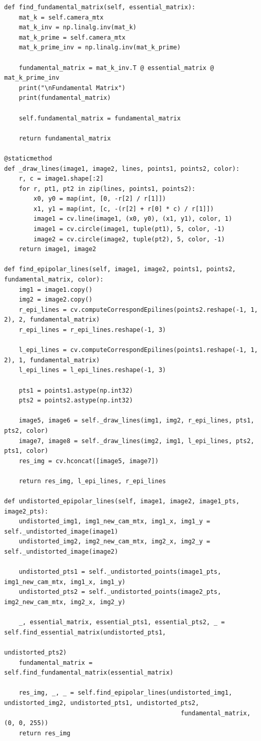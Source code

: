 \documentclass[a4paper, 12pt]{article}
\begin{document}
    \begin{lstlisting}
def find_fundamental_matrix(self, essential_matrix):
    mat_k = self.camera_mtx
    mat_k_inv = np.linalg.inv(mat_k)
    mat_k_prime = self.camera_mtx
    mat_k_prime_inv = np.linalg.inv(mat_k_prime)

    fundamental_matrix = mat_k_inv.T @ essential_matrix @ mat_k_prime_inv
    print("\nFundamental Matrix")
    print(fundamental_matrix)

    self.fundamental_matrix = fundamental_matrix

    return fundamental_matrix

@staticmethod
def _draw_lines(image1, image2, lines, points1, points2, color):
    r, c = image1.shape[:2]
    for r, pt1, pt2 in zip(lines, points1, points2):
        x0, y0 = map(int, [0, -r[2] / r[1]])
        x1, y1 = map(int, [c, -(r[2] + r[0] * c) / r[1]])
        image1 = cv.line(image1, (x0, y0), (x1, y1), color, 1)
        image1 = cv.circle(image1, tuple(pt1), 5, color, -1)
        image2 = cv.circle(image2, tuple(pt2), 5, color, -1)
    return image1, image2

def find_epipolar_lines(self, image1, image2, points1, points2, fundamental_matrix, color):
    img1 = image1.copy()
    img2 = image2.copy()
    r_epi_lines = cv.computeCorrespondEpilines(points2.reshape(-1, 1, 2), 2, fundamental_matrix)
    r_epi_lines = r_epi_lines.reshape(-1, 3)

    l_epi_lines = cv.computeCorrespondEpilines(points1.reshape(-1, 1, 2), 1, fundamental_matrix)
    l_epi_lines = l_epi_lines.reshape(-1, 3)

    pts1 = points1.astype(np.int32)
    pts2 = points2.astype(np.int32)

    image5, image6 = self._draw_lines(img1, img2, r_epi_lines, pts1, pts2, color)
    image7, image8 = self._draw_lines(img2, img1, l_epi_lines, pts2, pts1, color)
    res_img = cv.hconcat([image5, image7])

    return res_img, l_epi_lines, r_epi_lines

def undistorted_epipolar_lines(self, image1, image2, image1_pts, image2_pts):
    undistorted_img1, img1_new_cam_mtx, img1_x, img1_y = self._undistorted_image(image1)
    undistorted_img2, img2_new_cam_mtx, img2_x, img2_y = self._undistorted_image(image2)

    undistorted_pts1 = self._undistorted_points(image1_pts, img1_new_cam_mtx, img1_x, img1_y)
    undistorted_pts2 = self._undistorted_points(image2_pts, img2_new_cam_mtx, img2_x, img2_y)

    _, essential_matrix, essential_pts1, essential_pts2, _ = self.find_essential_matrix(undistorted_pts1,
                                                                                        undistorted_pts2)
    fundamental_matrix = self.find_fundamental_matrix(essential_matrix)

    res_img, _, _ = self.find_epipolar_lines(undistorted_img1, undistorted_img2, undistorted_pts1, undistorted_pts2,
                                                fundamental_matrix, (0, 0, 255))
    return res_img
    \end{lstlisting}    
\end{document}
